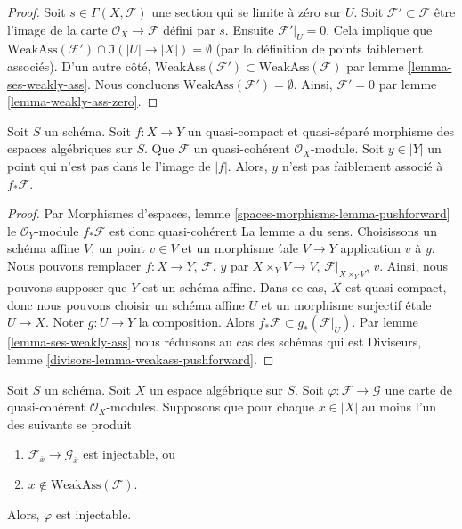 \begin{proof}
Soit $s \in \Gamma(X, \mathcal{F})$ une section qui se limite à zéro sur $U$.
Soit $\mathcal{F}' \subset \mathcal{F}$ être l'image de la carte
$\mathcal{O}_X \to \mathcal{F}$ défini par $s$. Ensuite $\mathcal{F}'|_U = 0$.
Cela implique que
$\text{WeakAss}(\mathcal{F}') \cap \Im(|U| \to |X|) = \emptyset$
(par la définition de points faiblement associés).
D'un autre côté,
$\text{WeakAss}(\mathcal{F}') \subset \text{WeakAss}(\mathcal{F})$
par lemme \ref{lemma-ses-weakly-ass}. Nous concluons
$\text{WeakAss}(\mathcal{F}') = \emptyset$.
Ainsi, $\mathcal{F}' = 0$ par lemme \ref{lemma-weakly-ass-zero}.
\end{proof}

\begin{lemma}
\label{lemma-weakass-pushforward}
Soit $S$ un schéma. Soit $f : X \to Y$ un quasi-compact et quasi-séparé
morphisme des espaces algébriques sur $S$. Que $\mathcal{F}$ un quasi-cohérent
$\mathcal{O}_X$-module. Soit $y \in |Y|$ un point qui n'est pas dans le
l'image de $|f|$. Alors, $y$ n'est pas faiblement associé à $f_*\mathcal{F}$.
\end{lemma}

\begin{proof}
Par Morphismes d'espaces, lemme \ref{spaces-morphisms-lemma-pushforward}
le $\mathcal{O}_Y$-module $f_*\mathcal{F}$ est donc quasi-cohérent
La lemme a du sens.
Choisissons un schéma affine $V$, un point $v \in V$ et un morphisme \'tale
$V \to Y$ application $v$ à $y$. Nous pouvons remplacer
$f : X \to Y$, $\mathcal{F}$, $y$ par
$X \times_Y V \to V$, $\mathcal{F}|_{X \times_Y V}$, $v$.
Ainsi, nous pouvons supposer que $Y$ est un schéma affine.
Dans ce cas, $X$ est quasi-compact, donc nous pouvons choisir
un schéma affine $U$ et un morphisme surjectif \'étale $U \to X$.
Noter $g : U \to Y$ la composition.
Alors $f_*\mathcal{F} \subset g_*(\mathcal{F}|_U)$.
Par lemme \ref{lemma-ses-weakly-ass}
nous réduisons au cas des schémas qui est
Diviseurs, lemme \ref{divisors-lemma-weakass-pushforward}.
\end{proof}

\begin{lemma}
\label{lemma-check-injective-on-weakass}
Soit $S$ un schéma. Soit $X$ un espace algébrique sur $S$.
Soit $\varphi : \mathcal{F} \to \mathcal{G}$ une carte de
quasi-cohérent $\mathcal{O}_X$-modules. Supposons que pour chaque
$x \in |X|$ au moins l'un des suivants se produit
\begin{enumerate}
\item $\mathcal{F}_{\overline{x}} \to \mathcal{G}_{\overline{x}}$
est injectable, ou
\item $x \not \in \text{WeakAss}(\mathcal{F})$.
\end{enumerate}
Alors, $\varphi$ est injectable.
\end{lemma}

